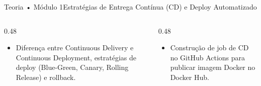 \begin{senaiframe}{Teoria • Módulo 1}{Estratégias de Entrega Contínua (CD) e Deploy Automatizado}
  \begin{columns}[t]
    \begin{column}{0.48\textwidth}
      \begin{tcolorbox}[senaibluecard, title={Fundamentos Teóricos}]
        \begin{itemize}
          \item Diferença entre Continuous Delivery e Continuous Deployment, estratégias de deploy (Blue-Green, Canary, Rolling Release) e rollback.
        \end{itemize}
      \end{tcolorbox}
    \end{column}
    \begin{column}{0.48\textwidth}
      \begin{tcolorbox}[senaigreencard, title={Prática \& Laboratório}]
        \begin{itemize}
          \item Construção de job de CD no GitHub Actions para publicar imagem Docker no Docker Hub.
        \end{itemize}
      \end{tcolorbox}
    \end{column}
  \end{columns}
\end{senaiframe}
